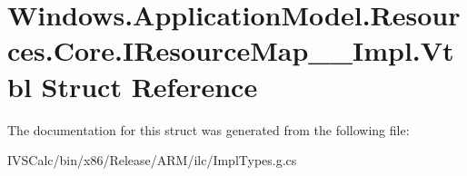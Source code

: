 \hypertarget{struct_windows_1_1_application_model_1_1_resources_1_1_core_1_1_i_resource_map_____impl_1_1_vtbl}{}\section{Windows.\+Application\+Model.\+Resources.\+Core.\+I\+Resource\+Map\+\_\+\+\_\+\+Impl.\+Vtbl Struct Reference}
\label{struct_windows_1_1_application_model_1_1_resources_1_1_core_1_1_i_resource_map_____impl_1_1_vtbl}


The documentation for this struct was generated from the following file\+:\begin{DoxyCompactItemize}
\item 
I\+V\+S\+Calc/bin/x86/\+Release/\+A\+R\+M/ilc/Impl\+Types.\+g.\+cs\end{DoxyCompactItemize}
